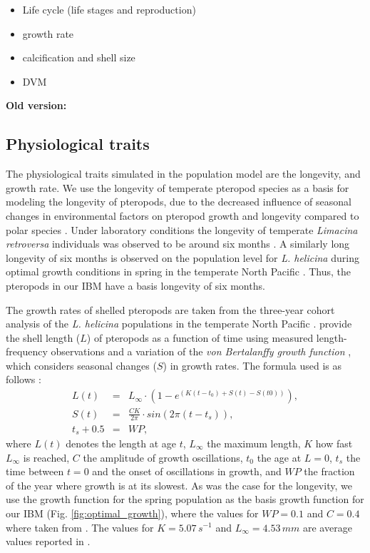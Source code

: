\begin{itemize}
    \item Life cycle (life stages and reproduction)
    \item growth rate
    \item calcification and shell size
    \item DVM
\end{itemize}

\textbf{Old version:}

\subsection{Physiological traits} \label{sec:physiological_traits}
The physiological traits simulated in the population model are the longevity, and growth rate. We use the longevity of temperate pteropod species as a basis for modeling the longevity of pteropods, due to the decreased influence of seasonal changes in environmental factors \citep[e.g. temperature and food availability; ][]{Bednarsek2012PteropodDistribution,Wang2017Lifecycle} on pteropod growth and longevity compared to polar species \citep{Manno2017ReviewPteropodVulnerability}. Under laboratory conditions the longevity of temperate \textit{Limacina retroversa} individuals was observed to be around six months \citep{Thabet2015Lifestages}. A similarly long longevity of six months is observed on the population level for \textit{L. helicina} during optimal growth conditions in spring in the temperate North Pacific \citep{Wang2017Lifecycle}. Thus, the pteropods in our IBM have a basis longevity of six months.

The growth rates of shelled pteropods are taken from the three-year cohort analysis of the \textit{L. helicina} populations in the temperate North Pacific \citep{Wang2017Lifecycle}. \cite{Wang2017Lifecycle} provide the shell length ($L$) of pteropods as a function of time using measured length-frequency observations and a variation of the \textit{von Bertalanffy growth function} \citep[VBGF; ][]{Bertalanffy1938}, which considers seasonal changes ($S$) in growth rates. The formula used is as follows \citep{Somers1988,Wang2017Lifecycle}:
\begin{eqnarray}
L(t) & = & L_{\infty} \cdot (1 - e^{(K(t-t_0) + S(t) - S(t0))}), \\
S(t) & = & \frac{CK}{2\pi} \cdot sin(2\pi (t-t_s)), \\
t_s + 0.5 & = & WP,
\end{eqnarray}
\noindent
where $L(t)$ denotes the length at age $t$, $L_{\infty}$ the maximum length, $K$ how fast $L_{\infty}$ is reached, $C$ the amplitude of growth oscillations, $t_0$ the age at $L=0$, $t_s$ the time between $t=0$ and the onset of oscillations in growth, and $WP$ the fraction of the year where growth is at its slowest. As was the case for the longevity, we use the growth function for the spring population as the basis growth function for our IBM (Fig. \ref{fig:optimal_growth}), where the values for $WP=0.1$ and $C=0.4$ where taken from \cite{Wang2017Lifecycle}. The values for $K=5.07\, s^{-1}$ and $L_{\infty} = 4.53\, mm$ are average values reported in \cite{Wang2017Lifecycle}.


